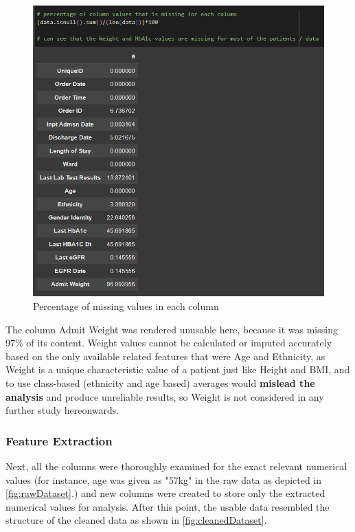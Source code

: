 \begin{figure}[H]
		\centering
		\includegraphics[scale=0.4]{figures/python_code/percent_missing_values_in_every_column.png}
		\caption{Percentage of missing values in each column}
		\label{fig:missingValuePercentages}
\end{figure}

\noindent The column Admit Weight was rendered unusable here, because it was missing 97\% of its content. Weight values cannot be calculated or imputed accurately based on the only available related features that were Age and Ethnicity, as Weight is a unique characteristic value of a patient just like Height and BMI, and to use class-based (ethnicity and age based) averages would \textbf{mislead the analysis} and produce unreliable results, so Weight is not considered in any further study hereonwards.

\subsubsection{Feature Extraction}
\noindent Next, all the columns were thoroughly examined for the exact relevant numerical values (for instance, age was given as "57kg" in the raw data as depicted in \autoref{fig:rawDataset}.) and new columns were created to store only the extracted numerical values for analysis. After this point, the usable data resembled the structure of the cleaned data as shown in \autoref{fig:cleanedDataset}.

